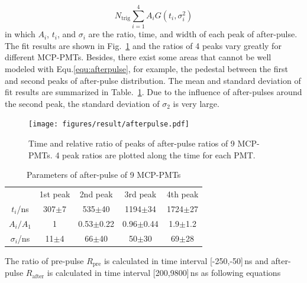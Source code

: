 \begin{equation}
    \label{equ:afterpulse}
    N_{\mathrm{trig}}\sum_{i=1}^{4}{A_iG(t_i,\sigma_i^2)}
\end{equation}
in which $A_i$, $t_i$, and $\sigma_i$ are the ratio, time, and width of each peak of after-pulse. The fit results are shown in Fig.~\ref{fig:afterpulsePeak} and the ratios of 4 peaks vary greatly for different MCP-PMTs. Besides, there exist some areas that cannot be well modeled with Equ.\eqref{equ:afterpulse}, for example, the pedestal between the first and second peaks of after-pulse distribution. The mean and standard deviation of fit results are summarized in Table.~\ref{tab:afterpulse}. Due to the influence of after-pulses around the second peak, the standard deviation of $\sigma_2$ is very large.
\begin{figure}[!htbp]
    \centering
    \texttt{[image: figures/result/afterpulse.pdf]}
    \caption{Time and relative ratio of peaks of after-pulse ratios of 9 MCP-PMTs. 4 peak ratios are plotted along the time for each PMT.}
    \label{fig:afterpulsePeak}
\end{figure}
\begin{table}
    \centering
    \caption{Parameters of after-pulse of 9 MCP-PMTs}
    \label{tab:afterpulse}
    \begin{tabular}{c|c|c|c|c}
        \hline
        &1st peak&2nd peak&3rd peak&4th peak\\
        $t_i$/ns&307$\pm$7&535$\pm$40&1194$\pm$34&1724$\pm$27\\
        $A_i/A_1$&1&0.53$\pm$0.22&0.96$\pm$0.44&1.9$\pm$1.2\\
        $\sigma_i$/ns&11$\pm$4&66$\pm$40&50$\pm$30&69$\pm$28\\
        \hline
    \end{tabular}
\end{table}

The ratio of pre-pulse $R_{\mathrm{pre}}$ is calculated in time interval [-250,-50]\,ns and after-pulse $R_{\mathrm{after}}$ is calculated in time interval [200,9800]\,ns as following equations

